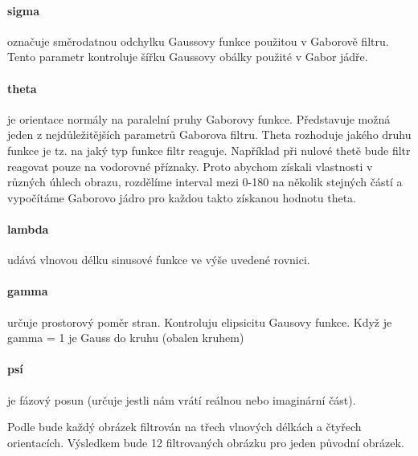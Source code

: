 \documentclass[czech,BP]{thesiskiv}
\begin{document}
\paragraph{sigma} označuje směrodatnou odchylku Gaussovy funkce použitou v Gaborově filtru. Tento parametr kontroluje šířku Gaussovy obálky použité v Gabor jádře.

\paragraph{theta} je orientace normály na paralelní pruhy Gaborovy funkce. Představuje možná jeden z nejdůležitějších parametrů Gaborova filtru. Theta rozhoduje jakého druhu funkce je tz. na jaký typ funkce filtr reaguje. Například při nulové thetě bude filtr reagovat pouze na vodorovné příznaky. Proto abychom získali vlastnosti v různých úhlech obrazu, rozdělíme interval mezi 0-180 na několik stejných částí a vypočítáme Gaborovo jádro pro každou takto získanou hodnotu theta.

\paragraph{lambda} udává vlnovou délku sinusové funkce ve výše uvedené rovnici.

\paragraph{gamma} určuje prostorový poměr stran. Kontroluju elipsicitu Gausovy funkce. Když je gamma = 1 je Gauss do kruhu (obalen kruhem)

\paragraph{psí} je fázový posun (určuje jestli nám vrátí reálnou nebo imaginární část). \\ 

\par Podle \citep{JEC} bude každý obrázek filtrován na třech vlnových délkách a čtyřech orientacích. Výsledkem bude 12 filtrovaných obrázku pro jeden původní obrázek. 
\end{document}

